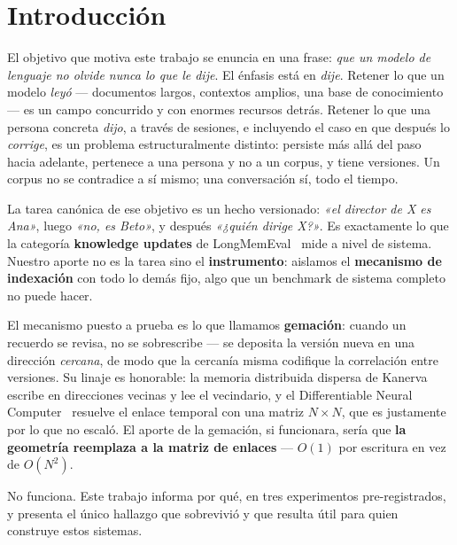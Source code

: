 \documentclass[11pt,a4paper]{article}
\begin{document}
\begin{abstract}
\vspace{0.6em}
\noindent\textbf{Palabras clave:} memoria conversacional, generación aumentada por recuperación,
actualizaciones de conocimiento, geometría de embeddings, pre-registro, resultados negativos,
resolución de co-referencia
\end{abstract}

\section{Introducción}

El objetivo que motiva este trabajo se enuncia en una frase: \emph{que un modelo de lenguaje no
olvide nunca lo que le dije}. El énfasis está en \emph{dije}. Retener lo que un modelo \emph{leyó}
--- documentos largos, contextos amplios, una base de conocimiento --- es un campo concurrido y con
enormes recursos detrás. Retener lo que una persona concreta \emph{dijo}, a través de sesiones, e
incluyendo el caso en que después lo \emph{corrige}, es un problema estructuralmente distinto:
persiste más allá del paso hacia adelante, pertenece a una persona y no a un corpus, y tiene
versiones. Un corpus no se contradice a sí mismo; una conversación sí, todo el tiempo.

La tarea canónica de ese objetivo es un hecho versionado: \emph{«el director de X es Ana»}, luego
\emph{«no, es Beto»}, y después \emph{«¿quién dirige X?»}. Es exactamente lo que la categoría
\textbf{knowledge updates} de LongMemEval~\cite{longmemeval} mide a nivel de sistema. Nuestro aporte
no es la tarea sino el \textbf{instrumento}: aislamos el \textbf{mecanismo de indexación} con todo lo
demás fijo, algo que un benchmark de sistema completo no puede hacer.

El mecanismo puesto a prueba es lo que llamamos \textbf{gemación}: cuando un recuerdo se revisa, no
se sobrescribe --- se deposita la versión nueva en una dirección \emph{cercana}, de modo que la
cercanía misma codifique la correlación entre versiones. Su linaje es honorable: la memoria
distribuida dispersa de Kanerva~\cite{kanerva} escribe en direcciones vecinas y lee el vecindario, y
el Differentiable Neural Computer~\cite{dnc} resuelve el enlace temporal con una matriz $N \times N$,
que es justamente por lo que no escaló. El aporte de la gemación, si funcionara, sería que
\textbf{la geometría reemplaza a la matriz de enlaces} --- $O(1)$ por escritura en vez de $O(N^2)$.

No funciona. Este trabajo informa por qué, en tres experimentos pre-registrados, y presenta el único
hallazgo que sobrevivió y que resulta útil para quien construye estos sistemas.
\end{document}
